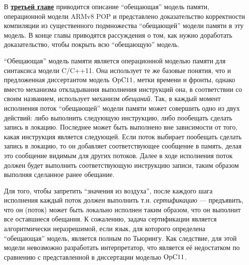 
В \underline{\textbf{третьей главе}} приводится описание ``обещающая'' модель памяти, операционной модели ARMv8 POP и представлено доказательство
корректности компиляции из существенного подмножества ``обещающей'' модели памяти в эту модель.
В конце главы приводятся рассуждения о том, как нужно доработать доказательство, чтобы покрыть всю ``обещающую'' модель.

``Обещающая'' модель памяти является операционной моделью памяти для синтаксиса модели C/C++11.
Она использует те же базовые понятия, что и предложенная диссертантом модель $\mathrm{OpC11}$,
метки времени и фронты, однако вместо механизма откладывания выполнения инструкций она,
в соответствии со своим названием, использует механизм \emph{обещаний}. Так, в каждый момент исполнения поток
``обещающей'' модели памяти может совершить одно из двух действий: либо выполнить следующую инструкцию,
либо пообещать сделать запись в локацию. Последнее может быть выполнено вне зависимости от того, какая
инструкция является следующей.
Если поток выбирает пообещать сделать запись в локацию, то он добавляет соответствующее сообщение в память,
делая это сообщение видимым для других потоков. Далее в ходе исполнения поток должен будет выполнить соответствующую инструкцию записи, таким образом выполняя сделанное ранее обещание.

Для того, чтобы запретить ``значения из воздуха'', после каждого шага исполнения каждый поток должен выполнить
т.н. \emph{сертификацию} --- предъявить, что он (поток) может быть локально исполнен таким образом, что
он выполнит все оставшиеся обещания. К сожалению, задача сертификации является алгоритмически неразрешимой, если
язык, для которого определена ``обещающая'' модель, является полным по Тьюрингу. Как следствие, для
этой модели невозможно разработать интерпретатор, что является её недостатком по сравнению с представленной в
диссертации моделью $\mathrm{OpC11}$.

